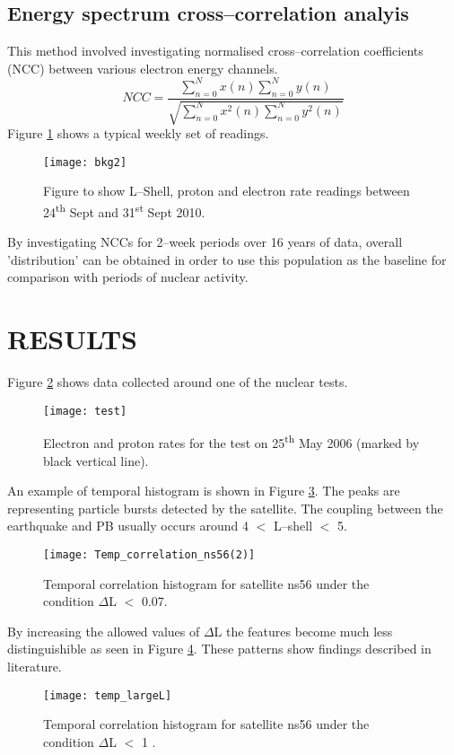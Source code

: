 \documentclass[twocolumn,prl,nobalancelastpage,aps,10pt,floatfix]{revtex4-1}
\begin{document}
\subsection{Energy spectrum cross--correlation analyis} 

This method involved investigating normalised cross--correlation coefficients (NCC) between various electron energy channels.
\begin{equation}
NCC = \frac{\sum_{n=0}^{N}x(n)\sum_{n=0}^{N}y(n)}{\sqrt{\sum_{n=0}^{N}x^2(n)\sum_{n=0}^{N}y^2(n)}}
\end{equation}
Figure \ref{bkg} shows a typical weekly set of readings.
\begin{figure}
\texttt{[image: bkg2]} 
\caption{Figure to show L--Shell, proton and electron rate readings between 24\textsuperscript{th} Sept and 31\textsuperscript{st} Sept 2010.}\label{bkg} 
\end{figure}
By investigating NCCs for 2--week periods over 16 years of data, overall 'distribution' can be obtained in order to use this population as the baseline for comparison with periods of nuclear activity.
 
\section{RESULTS} 
Figure \ref{test} shows data collected around one of the nuclear tests.
\begin{figure} 
	\texttt{[image: test]} 
	\caption{Electron and proton rates for the test on 25\textsuperscript{th} May 2006 (marked by black vertical line).}\label{test} 
\end{figure} 
An example of temporal histogram is shown in Figure \ref{temp}. The peaks are representing particle bursts detected by the satellite. The coupling between the earthquake and PB usually occurs around 4 $<$ L--shell $<$ 5.
\begin{figure} 
	\texttt{[image: Temp\_correlation\_ns56(2)]} 
	\caption{Temporal correlation histogram for satellite ns56 under the condition $\Delta$L $<$ 0.07.}\label{temp} 
\end{figure} 
By increasing the allowed values of $\Delta$L the features become much less distinguishible as seen in Figure \ref{temp_largeL}. These patterns show findings described in literature.
\begin{figure} 
	\texttt{[image: temp\_largeL]} 
	\caption{Temporal correlation histogram for satellite ns56 under the condition $\Delta$L $<$ 1  .}\label{temp_largeL} 
\end{figure}
\end{document}
